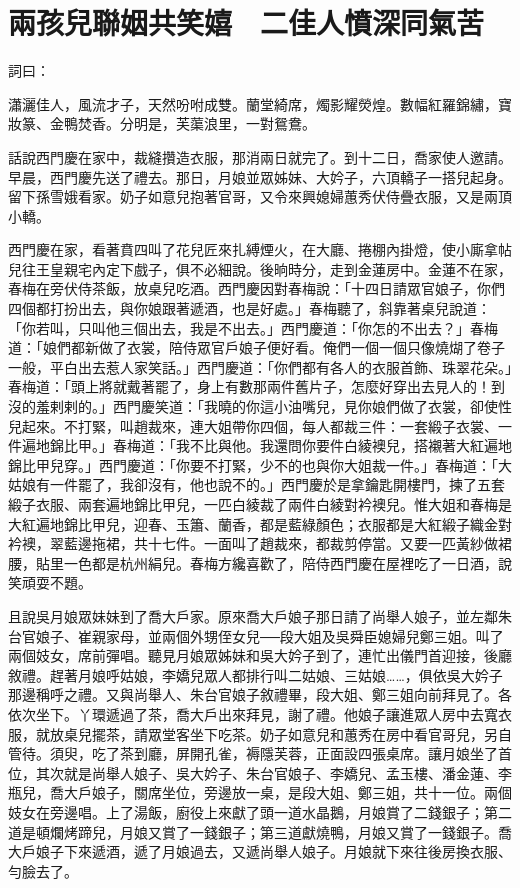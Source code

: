 %

\chapter{兩孩兒聯姻共笑嬉　二佳人憤深同氣苦}

詞曰：

瀟灑佳人，風流才子，天然吩咐成雙。蘭堂綺席，燭影耀熒煌。數幅紅羅錦繡，寶妝篆、金鴨焚香。分明是，芙蕖浪里，一對鴛鴦。

話說西門慶在家中，裁縫攢造衣服，那消兩日就完了。到十二日，喬家使人邀請。早晨，西門慶先送了禮去。那日，月娘並眾姊妹、大妗子，六頂轎子一搭兒起身。留下孫雪娥看家。奶子如意兒抱著官哥，又令來興媳婦蕙秀伏侍疊衣服，又是兩頂小轎。

西門慶在家，看著賁四叫了花兒匠來扎縛煙火，在大廳、捲棚內掛燈，使小廝拿帖兒往王皇親宅內定下戲子，俱不必細說。後晌時分，走到金蓮房中。金蓮不在家，春梅在旁伏侍茶飯，放桌兒吃酒。西門慶因對春梅說：「十四日請眾官娘子，你們四個都打扮出去，與你娘跟著遞酒，也是好處。」春梅聽了，斜靠著桌兒說道： 「你若叫，只叫他三個出去，我是不出去。」西門慶道：「你怎的不出去？」春梅道：「娘們都新做了衣裳，陪侍眾官戶娘子便好看。俺們一個一個只像燒煳了卷子一般，平白出去惹人家笑話。」西門慶道：「你們都有各人的衣服首飾、珠翠花朵。」春梅道：「頭上將就戴著罷了，身上有數那兩件舊片子，怎麼好穿出去見人的！到沒的羞剌剌的。」西門慶笑道：「我曉的你這小油嘴兒，見你娘們做了衣裳，卻使性兒起來。不打緊，叫趙裁來，連大姐帶你四個，每人都裁三件：一套緞子衣裳、一件遍地錦比甲。」春梅道：「我不比與他。我還問你要件白綾襖兒，搭襯著大紅遍地錦比甲兒穿。」西門慶道：「你要不打緊，少不的也與你大姐裁一件。」春梅道：「大姑娘有一件罷了，我卻沒有，他也說不的。」西門慶於是拿鑰匙開樓門，揀了五套緞子衣服、兩套遍地錦比甲兒，一匹白綾裁了兩件白綾對衿襖兒。惟大姐和春梅是大紅遍地錦比甲兒，迎春、玉簫、蘭香，都是藍綠顏色；衣服都是大紅緞子織金對衿襖，翠藍邊拖裙，共十七件。一面叫了趙裁來，都裁剪停當。又要一匹黃紗做裙腰，貼里一色都是杭州絹兒。春梅方纔喜歡了，陪侍西門慶在屋裡吃了一日酒，說笑頑耍不題。

且說吳月娘眾妹妹到了喬大戶家。原來喬大戶娘子那日請了尚舉人娘子，並左鄰朱台官娘子、崔親家母，並兩個外甥侄女兒──段大姐及吳舜臣媳婦兒鄭三姐。叫了兩個妓女，席前彈唱。聽見月娘眾姊妹和吳大妗子到了，連忙出儀門首迎接，後廳敘禮。趕著月娘呼姑娘，李嬌兒眾人都排行叫二姑娘、三姑娘……，俱依吳大妗子那邊稱呼之禮。又與尚舉人、朱台官娘子敘禮畢，段大姐、鄭三姐向前拜見了。各依次坐下。丫環遞過了茶，喬大戶出來拜見，謝了禮。他娘子讓進眾人房中去寬衣服，就放桌兒擺茶，請眾堂客坐下吃茶。奶子如意兒和蕙秀在房中看官哥兒，另自管待。須臾，吃了茶到廳，屏開孔雀，褥隱芙蓉，正面設四張桌席。讓月娘坐了首位，其次就是尚舉人娘子、吳大妗子、朱台官娘子、李嬌兒、孟玉樓、潘金蓮、李瓶兒，喬大戶娘子，關席坐位，旁邊放一桌，是段大姐、鄭三姐，共十一位。兩個妓女在旁邊唱。上了湯飯，廚役上來獻了頭一道水晶鵝，月娘賞了二錢銀子；第二道是頓爛烤蹄兒，月娘又賞了一錢銀子；第三道獻燒鴨，月娘又賞了一錢銀子。喬大戶娘子下來遞酒，遞了月娘過去，又遞尚舉人娘子。月娘就下來往後房換衣服、勻臉去了。


